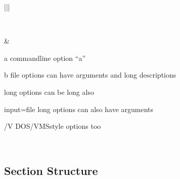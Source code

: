 \documentclass[letterpaper,10pt,english]{sphinxmanual}
\begin{document}
\begin{savenotes}
\begin{tabular}[t]{|*{2}{|}}
\begin{quote}
\begin{description}
\end{description}\end{quote}
\\
\hline
\begin{sphinxVerbatimintable}[commandchars=\\\{\}]
              
           
                
            
      
              
\end{sphinxVerbatimintable}
&\begin{optionlist}{3cm}
\item [\sphinxhyphen{}a]  
command\sphinxhyphen{}line option “a”
\item [\sphinxhyphen{}b file]  
options can have arguments
and long descriptions
\item [\sphinxhyphen{}\sphinxhyphen{}long]  
options can be long also
\item [\sphinxhyphen{}\sphinxhyphen{}input=file]  
long options can also have
arguments
\item [/V]  
DOS/VMS\sphinxhyphen{}style options too
\end{optionlist}
\\
\hline
\end{tabular}
\par
\sphinxattableend\end{savenotes}




\subsection{Section Structure}
\label{\detokenize{rst-cheatsheet/rst-cheatsheet:section-structure}}
\end{document}
